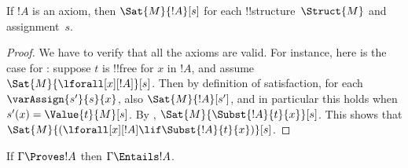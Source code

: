\begin{prop}
  If $!A$ is an axiom, then
  $\Sat{M}{!A}[s]$ for each !!{structure}~$\Struct{M}$ and assignment~$s$.
\end{prop}

\begin{proof}
We have to verify that all the axioms are valid. For
  instance, here is the case for : suppose $t$ is
  !!{free for} $x$ in $!A$, and assume
  $\Sat{M}{\lforall[x][!A]}[s]$. Then by definition of satisfaction,
  for each $\varAssign{s'}{s}{x}$, also $\Sat{M}{!A}[s']$, and in particular
  this holds when $s'(x) = \Value{t}{M}[s]$. By
  ,
  $\Sat{M}{\Subst{!A}{t}{x}}[s]$. This shows that
  $\Sat{M}{(\lforall[x][!A] \lif \Subst{!A}{t}{x})}[s]$.
\end{proof}

\begin{thm}[Soundness]
If $\Gamma \Proves !A$ then $\Gamma \Entails !A$.
\end{thm}

